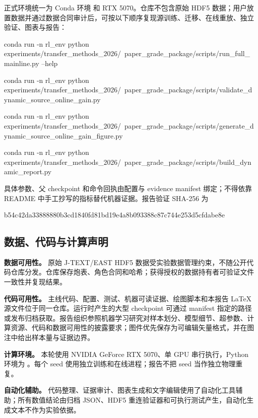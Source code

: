 正式环境统一为 Conda 环境  和 RTX 5070。仓库不包含原始 HDF5 数据；用户放置数据并通过数据合同审计后，可按以下顺序复现源训练、迁移、在线重放、独立验证、图表与报告：

\begin{ReportVerbatim}
conda run -n rl_env python experiments/transfer_methods_2026/\
  paper_grade_package/scripts/run_full_mainline.py --help

conda run -n rl_env python experiments/transfer_methods_2026/\
  paper_grade_package/scripts/validate_dynamic_source_online_gain.py

conda run -n rl_env python experiments/transfer_methods_2026/\
  paper_grade_package/scripts/generate_dynamic_source_online_gain_figure.py

conda run -n rl_env python experiments/transfer_methods_2026/\
  paper_grade_package/scripts/build_dynamic_report.py
\end{ReportVerbatim}

具体参数、父 checkpoint 和命令回执由配置与 evidence manifest 绑定；不得依靠 README 中手工抄写的指标替代机器证据。报告验证 SHA-256 为
\begin{center}
\small\ttfamily
b54c42da33888880b3cd1840fd81bd19e4a8b093388c87c744e253d5cfdabe8e
\end{center}

\subsection{数据、代码与计算声明}

\textbf{数据可用性。} 原始 J-TEXT/EAST HDF5 数据受实验数据管理约束，不随公开代码仓库分发。仓库保存炮表、角色合同和哈希；获得授权的数据持有者可验证文件一致性并复现结果。

\textbf{代码可用性。} 主线代码、配置、测试、机器可读证据、绘图脚本和本报告 LaTeX 源文件位于同一仓库。运行时产生的大型 checkpoint 可通过 manifest 指定的路径或发布归档获取。报告组织参照机器学习研究对样本划分、模型细节、超参数、计算资源、代码和数据可用性的披露要求\citep{natureMLChecklist,natureReporting}；图件优先保存为可编辑矢量格式，并在图注中给出样本量与证据边界\citep{natureFigures}。

\textbf{计算环境。} 本轮使用 NVIDIA GeForce RTX 5070、单 GPU 串行执行，Python 环境为 \code{rl_env}。每个 seed 使用独立训练和在线进程；报告不把 seed 当作独立物理重复。

\textbf{自动化辅助。} 代码整理、证据审计、图表生成和文字编辑使用了自动化工具辅助；所有数值结论由归档 JSON、HDF5 重连验证器和可执行测试产生，自动化生成文本不作为实验依据。

